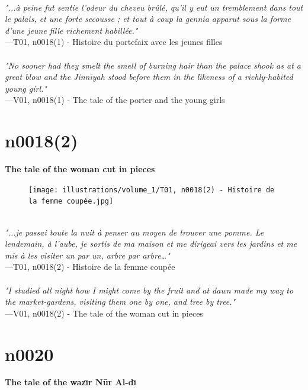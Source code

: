 \documentclass[../Carre_nights.tex]{subfiles}
\begin{document}
\textit{\\
"...à peine fut sentie l’odeur du cheveu brûlé, qu’il y eut un tremblement dans tout le palais, et une forte secousse ; et tout à coup la gennia apparut sous la forme d’une jeune fille richement habillée."} \\
—T01, n0018(1) - Histoire du portefaix avec les jeunes filles \\~\\
\textit{"No sooner had they smelt the smell of burning hair than the palace shook as at a great blow and the Jinn\={\i}yah stood before them in the likeness of a richly-habited young girl."} \\
—V01, n0018(1) - The tale of the porter and the young girls

\newpage

\section{n0018(2)}
\textbf{\Large{The tale of the woman cut in pieces}} \\

\begin{figure}[ht]
\centering
\texttt{[image: illustrations/volume\_1/T01, n0018(2) - Histoire de la femme coupée.jpg]}
\end{figure}

\textit{\\
"...je passai toute la nuit à penser au moyen de trouver une pomme. Le lendemain, à l’aube, je sortis de ma maison et me dirigeai vers les jardins et me mis à les visiter un par un, arbre par arbre…"} \\
—T01, n0018(2) - Histoire de la femme coupée \\~\\
\textit{"I studied all night how I might come by the fruit and at dawn made my way to the market-gardens, visiting them one by one, and tree by tree."} \\
—V01, n0018(2) - The tale of the woman cut in pieces

\newpage

\section{n0020}
\textbf{\Large{The tale of the waz\={\i}r N\=ur Al-d\={\i}}} \\
\end{document}
